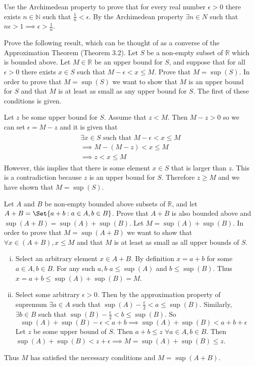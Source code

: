 \documentclass[paper=a4, fontsize=11pt]{jhwhw} %
\begin{document}
Use the Archimedean property to prove that for every real number $\epsilon > 0$ there exists $n\in \mathbb N$ such that $\frac{1}{n} < \epsilon$. 
\solution
By the Archimedean property $\exists n\in N$ such that $n\epsilon > 1 \implies \epsilon > \frac{1}{n}$.

Prove the following result, which can be thought of as a converse of the Approximation Theorem (Theorem 3.2). Let $S$ be a non-empty subset of $\mathbb R$ which is bounded above. Let $M\in \mathbb R$ be an upper bound for $S$, and suppose that for all $\epsilon > 0$ there exists $x\in S$ such that $M-\epsilon < x\le M$. Prove that $M = \sup(S)$. 
\solution
In order to prove that $M = \sup(S)$ we want to show that $M$ is an upper bound for $S$ and that $M$ is at least as small as any upper bound for $S$. The first of these conditions is given.

Let $z$ be some upper bound for $S$. Assume that $z < M$. Then $M - z > 0$ so we can set $\epsilon = M - z$ and it is given that 
\begin{align}
    \begin{split}
        &\exists x \in S\text{ such that } M-\epsilon < x \le M\\
        &\implies M - ( M- z) < x \le M\\
        &\implies z < x \le M
    \end{split}
\end{align}
However, this implies that there is some element $x\in S$ that is larger than $z$. This is a contradiction because $z$ is an upper bound for $S$. Therefore $z \ge M$ and we have shown that $M = \sup(S)$. 

Let $A$ and $B$ be non-empty bounded above subsets of $\mathbb R$, and let $A + B = \Set{a + b:a\in A, b\in B}$. Prove that $A + B$ is also bounded above and $\sup(A+B) = \sup(A) + \sup(B)$. 
\solution
Let $M = \sup(A) + \sup(B)$. In order to prove that $M = \sup(A+B)$ we want to show that $\forall x \in (A+B), x\le M$ and that $M$ is at least as small as all upper bounds of $S$. 
\begin{enumerate}[i.]
    \item Select an arbitrary element $x\in A+B$. By definition $x = a+b$ for some $a\in A, b\in B$. For any such $a, b$ $a\le \sup(A)$ and $b\le \sup(B)$. Thus $x = a + b \le \sup(A) + \sup(B) = M$.

    \item Select some arbitrary $\epsilon > 0$. Then by the approximation property of supremum $\exists a\in A$ such that $\sup(A) - \frac{\epsilon}{2} < a \le \sup(B)$. Similarly, $\exists b\in B$ such that $\sup(B) - \frac{\epsilon}{2} < b \le \sup(B)$. So
        $$\sup(A) + \sup(B) - \epsilon < a +b\implies \sup(A) + \sup(B) < a + b + \epsilon$$
        Let $z$ be some upper bound of $S$. Then $a + b \le z$ $\forall a\in A, b\in B$. Then $\sup(A) + \sup(B) < z + \epsilon \implies M = \sup(A) + \sup(B) \le z$. 
\end{enumerate}
Thus $M$ has satisfied the necessary conditions and $M = \sup(A+B)$. 
\end{document}
